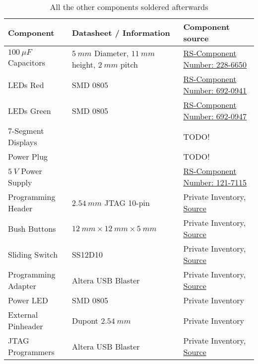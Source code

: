 \begin{table}[h!]
	\centering
	\begin{tabular}{|p{4.9cm}|p{4.9cm}|p{4.9cm}|}
		\hline
		Component & Datasheet / Information & Component source\\
		\hline
		$\SI{100}{\mu{}F}$ Capacitors & $\SI{5}{mm}$ Diameter, $\SI{11}{mm}$ height, $\SI{2}{mm}$ pitch & \href{https://de.rs-online.com/web/p/aluminium-elektrolytkondensatoren/2286650}{RS-Component Number: 228-6650} \\
		\hline
		LEDs Red & SMD 0805 & \href{https://de.rs-online.com/web/p/leds/6920941}{RS-Component Number: 692-0941} \\
		\hline
		LEDs Green & SMD 0805 & \href{https://de.rs-online.com/web/p/leds/6920947}{RS-Component Number: 692-0947} \\
		\hline
		7-Segment Displays & & TODO! \\
		\hline
		Power Plug & & TODO! \\
		\hline
		$\SI{5}{V}$ Power Supply & & \href{https://de.rs-online.com/web/p/steckernetzteile/1217115}{RS-Component Number: 121-7115} \\
		\hline
		Programming Header & $\SI{2,54}{mm}$ JTAG 10-pin & Private Inventory, \href{https://www.amazon.de/dp/B00R1LS3QY}{Source} \\
		\hline
		Bush Buttons & $\SI{12}{mm} \times \SI{12}{mm} \times \SI{5}{mm}$ & Private Inventory, \href{https://de.aliexpress.com/item/32726177349.html}{Source} \\
		\hline
		Sliding Switch & SS12D10 & Private Inventory, \href{https://de.aliexpress.com/item/4001325159135.html}{Source} \\
		\hline
		Programming Adapter & Altera USB Blaster & Private Inventory, \href{https://de.aliexpress.com/item/1005006124817358.html}{Source} \\
		\hline
		Power LED & SMD 0805 & Private Inventory \\
		\hline
		External Pinheader & Dupont $\SI{2.54}{mm}$ & Private Inventory \\
		\hline
		JTAG Programmers & Altera USB Blaster & Private Inventory, \href{https://de.aliexpress.com/item/1005006124817358.html}{Source} \\
		\hline
	\end{tabular}
	\caption{All the other components soldered afterwards}
	\label{tab:components_other}
\end{table}
